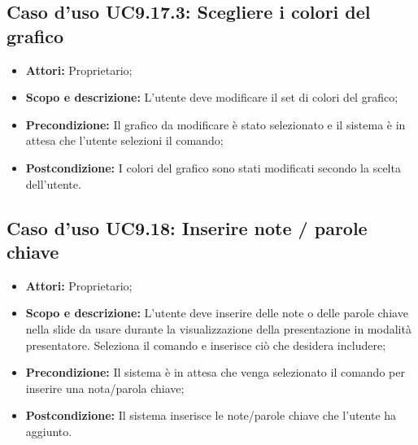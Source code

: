 		\subsection{Caso d'uso UC9.17.3: Scegliere i colori del grafico}
		\begin{itemize}
			\item \textbf{Attori:} Proprietario;
			\item \textbf{Scopo e descrizione:} L'utente deve modificare il set di colori del grafico;
			\item \textbf{Precondizione:} Il grafico da modificare è stato selezionato e il sistema è in attesa che l'utente selezioni il comando;
			\item \textbf{Postcondizione:} I colori del grafico sono stati modificati secondo la scelta dell'utente.
		\end{itemize}


\subsection{Caso d'uso UC9.18: Inserire note / parole chiave}
\begin{itemize}
	\item \textbf{Attori:} Proprietario;
	\item \textbf{Scopo e descrizione:} L'utente deve inserire delle note o delle parole chiave nella slide da usare durante la visualizzazione della presentazione in modalità presentatore. Seleziona il comando e inserisce ciò che desidera includere;
	\item \textbf{Precondizione:} Il sistema è in attesa che venga selezionato il comando per inserire una nota/parola chiave;
	\item \textbf{Postcondizione:} Il sistema inserisce le note/parole chiave che l'utente ha aggiunto.
\end{itemize}